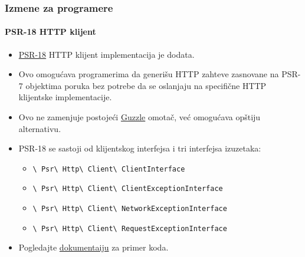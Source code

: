 
\begin{frame}[fragile]
	\frametitle{Izmene za programere}
	\framesubtitle{PSR-18 HTTP klijent}

	\begin{itemize}
		\item \href{https://www.php-fig.org/psr/psr-18/}{PSR-18}
			HTTP klijent implementacija je dodata.
		\item Ovo omogućava programerima da generišu HTTP zahteve zasnovane na PSR-7
			objektima poruka bez potrebe da se oslanjaju na specifične HTTP klijentske implementacije.
		\item Ovo ne zamenjuje postojeći \href{http://guzzlephp.org/}{Guzzle}
			omotač, već omogućava opštiju alternativu.
		\item PSR-18 se sastoji od klijentskog interfejsa i tri interfejsa izuzetaka:

			\begin{itemize}\smaller
				\item \texttt{\textbackslash
					Psr\textbackslash
					Http\textbackslash
					Client\textbackslash
					ClientInterface}
				\item \texttt{\textbackslash
					Psr\textbackslash
					Http\textbackslash
					Client\textbackslash
					ClientExceptionInterface}
				\item \texttt{\textbackslash
					Psr\textbackslash
					Http\textbackslash
					Client\textbackslash
					NetworkExceptionInterface}
				\item \texttt{\textbackslash
					Psr\textbackslash
					Http\textbackslash
					Client\textbackslash
					RequestExceptionInterface}
			\end{itemize}\normalsize

		\item Pogledajte
			\href{https://docs.typo3.org/c/typo3/cms-core/master/en-us/Changelog/10.1/Feature-89216-PSR-18HTTPClientImplementation.html}{dokumentaiju}
			za primer koda.

	\end{itemize}

\end{frame}


